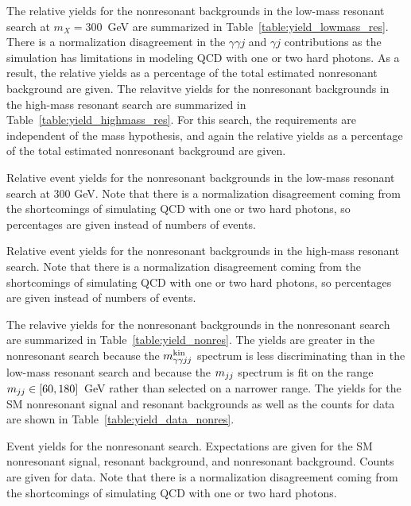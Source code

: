 The relative yields for the nonresonant backgrounds in the low-mass resonant search at $m_X = 300$~GeV
are summarized in
Table~\ref{table:yield_lowmass_res}. There is a normalization disagreement in the
$\gamma\gamma j$ and $\gamma j$ contributions as the simulation has limitations in modeling
QCD with one or two hard photons. As a result, the relative yields as a percentage of the total estimated
nonresonant background are given.
The relavitve yields for the nonresonant backgrounds in the high-mass resonant search are summarized in
Table~\ref{table:yield_highmass_res}. For this search, the requirements are independent of
the mass hypothesis, and again the relative yields as a percentage of the total estimated nonresonant
background are given.

\begin{table}[htbp!]
  \centering
  \renewcommand{\arraystretch}{1.4}
  \caption{Relative event yields for the nonresonant backgrounds in the low-mass resonant search
at 300 GeV. Note that there is a normalization disagreement coming from the shortcomings of
simulating QCD with one or two hard photons, so percentages are given instead of numbers
of events.}
  
  \label{table:yield_lowmass_res}
\end{table}

\begin{table}[htbp!]
  \centering
  \renewcommand{\arraystretch}{1.4}
  \caption{Relative event yields for the nonresonant backgrounds in the high-mass resonant search.
Note that there is a normalization disagreement coming from the shortcomings of simulating QCD with one
or two hard photons, so percentages are given instead of numbers of events.}
  
  \label{table:yield_highmass_res}
\end{table}

The relavive yields for the nonresonant backgrounds in the nonresonant search are summarized in
Table~\ref{table:yield_nonres}. The yields are greater in the nonresonant search
because the $m_{\gamma\gamma jj}^{\rm kin}$ spectrum is less
discriminating than in the low-mass resonant search and because the $m_{jj}$ spectrum is
fit on the range $m_{jj} \in [60,180]$~GeV rather than selected on a narrower range.
The yields for the SM nonresonant signal and resonant backgrounds as well as the counts for
data are shown in Table~\ref{table:yield_data_nonres}.

\begin{table}[htbp!]
  \centering
  \renewcommand{\arraystretch}{1.4}
  \caption{Event yields for the nonresonant search. Expectations are given for
the SM nonresonant signal, resonant background, and nonresonant background.
Counts are given for data. Note that
there is a normalization disagreement coming from the shortcomings of simulating QCD with one
or two hard photons.}
  
  \label{table:yield_nonres}
\end{table}


